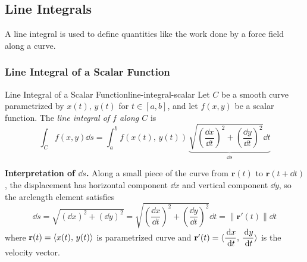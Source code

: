 \subsection{Line Integrals}

\begin{example}

  A line integral is used to define quantities like the work done by a force field along a curve.

  \begin{center}
  \end{center}
\end{example}

\subsubsection{Line Integral of a Scalar Function}

\begin{definition}{Line Integral of a Scalar Function}{line-integral-scalar}
  Let $C$ be a smooth curve parametrized by $x(t),\,y(t)$ for $t\in[a,b]$,
  and let $f(x,y)$ be a scalar function. The \emph{line integral of $f$ along $C$} is
  \[
    \int_C f(x,y)\dd{s}
    = \int_a^b f(x(t),\,y(t))\,
    \underbrace{\sqrt{\left(\frac{\dd{x}}{\dd{t}}\right)^2 + \left(\frac{\dd{y}}{\dd{t}}\right)^2}\dd{t}}_{\dd{s}}
  \]
\end{definition}

\textbf{Interpretation of $\dd{s}$.} Along a small piece of the curve from $\mathbf{r}(t)$
to $\mathbf{r}(t+\dd{t})$, the displacement has horizontal component $\dd{x}$ and vertical
component $\dd{y}$, so the arclength element satisfies
\[
  \dd{s} = \sqrt{(\dd{x})^2 + (\dd{y})^2}
  = \sqrt{\left(\frac{\dd{x}}{\dd{t}}\right)^2 + \left(\frac{\dd{y}}{\dd{t}}\right)^2}\dd{t}
  = \lVert\mathbf{r}'(t)\rVert\dd{t}
\]
where $\mathbf{r}(t) = \langle x(t),\,y(t) \rangle$ is parametrized curve and $\mathbf{r}'(t) = \langle \dfrac{\,\mathrm{d}x}{\,\mathrm{d}t},\,\dfrac{\,\mathrm{d}y}{\,\mathrm{d}t} \rangle$
is the velocity vector.

\begin{center}
\end{center}

